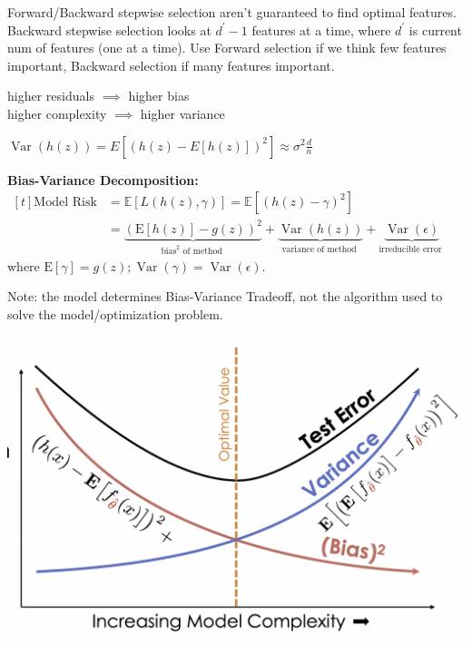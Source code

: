 \documentclass[10pt,landscape]{article}
\DeclareMathOperator*{\Var}{Var}
\def\E{\mathbb{E}}
\begin{document}
\begin{multicols}{3}
Forward/Backward stepwise selection aren't guaranteed to find optimal features. Backward stepwise selection looks at $d^{\prime}-1$ features at a time, where $d^{\prime}$ is current num of features (one at a time). Use Forward selection if we think few features important, Backward selection if many features important.

higher residuals $\implies$ higher bias\\
higher complexity $\implies$ higher variance

$\Var(h(z)) = E\left[(h(z)-E[h(z)])^{2}\right] \approx \sigma^2\frac d n$

\textbf{Bias-Variance Decomposition:} \\
$\begin{aligned}[t] \text{Model Risk} &=\E[L(h(z), \gamma)]
=\E[(h(z)-\gamma)^2] \\
&=\underbrace{(\mathrm{E}[h(z)]-g(z))^{2}}_{\text {bias}^{2} \text { of method }}+\underbrace{\operatorname{Var}(h(z))}_{\text {variance of method }}+\underbrace{\operatorname{Var}(\epsilon)}_{\text {irreducible error }}
\end{aligned}$ where $\mathrm{E}[\gamma]=g(z) ; \operatorname{Var}(\gamma)=\operatorname{Var}(\epsilon)$.

Note: the model determines Bias-Variance Tradeoff, not the algorithm used to solve the model/optimization problem.

\includegraphics[width=\linewidth]{Bias-Variance.png}




\end{multicols}
\end{document}
